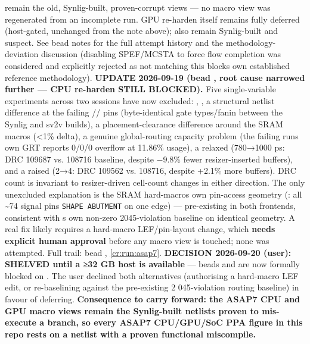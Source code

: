 \begin{record}
{remain the old, Synlig-built, proven-corrupt views} --- no macro view
was regenerated from an incomplete run. GPU re-harden itself remains
fully deferred (host-gated, unchanged from the note above);
 also remain Synlig-built and
suspect. See bead  notes for the full attempt history and the
methodology-deviation discussion (disabling SPEF/\allowbreak{}MCSTA to
force flow completion was considered and explicitly rejected as not
matching this block\textquotesingle s own established reference
methodology). \bad{} \textbf{UPDATE 2026-09-19 (bead , root
cause narrowed further --- CPU re-harden STILL BLOCKED).} Five
single-variable experiments across two sessions have now excluded:
, , a structural netlist
difference at the failing // pins
(byte-identical gate types/\allowbreak{}fanin between the Synlig and
sv2v builds), a placement-clearance difference around the SRAM macros
(\textless1\% delta), a genuine global-routing capacity problem (the
failing run\textquotesingle s own GRT reports 0/0/0 overflow at 11.86\%
usage), a relaxed  (780→1000 ps: DRC 109687 vs.
108716 baseline, despite −9.8\% fewer resizer-inserted buffers), and a
raised  (2→4: DRC 109562 vs. 108716,
despite +2.1\% more buffers). DRC count is invariant to resizer-driven
cell-count changes in either direction. The only unexcluded explanation
is the SRAM hard-macro\textquotesingle s own pin-access geometry
(: all \textasciitilde74 signal pins
\texttt{SHAPE\ ABUTMENT} on one edge) --- pre-existing in both
frontends, consistent with \textquotesingle s own non-zero
2045-violation baseline on identical geometry. A real fix likely
requires a hard-macro LEF/\allowbreak{}pin-layout change, which
\textbf{needs explicit human approval} before any macro view is touched;
none was attempted. Full trail: bead ,
\cref{cr:run:asap7}. \hold{} \textbf{DECISION 2026-09-20
(user): SHELVED until a ≥32 GB host is available} --- beads 
and  are now formally blocked on . The user declined
both alternatives (authorising a hard-macro LEF edit, or re-baselining
against the pre-existing 2 045-violation routing baseline) in favour of
deferring. \textbf{Consequence to carry forward: the ASAP7 CPU and GPU
macro views remain the Synlig-built netlists proven to mis-execute a
branch, so every ASAP7 CPU/\allowbreak{}GPU/\allowbreak{}SoC PPA figure
in this repo rests on a netlist with a proven functional miscompile.}

\end{record}
